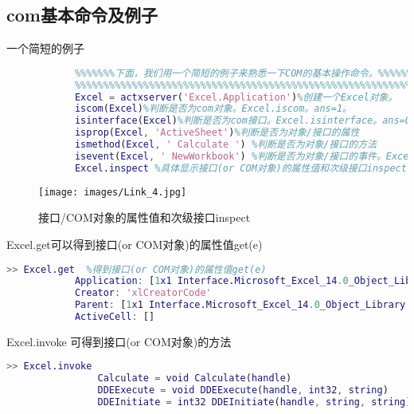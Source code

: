             \subsection{com基本命令及例子}
            一个简短的例子
            \begin{lstlisting}[language=Matlab]
            %%%%%%%%%%%%%%%%%%%%%%%%%%%%%%%%%%%%%%%%%%%%%%%%%%%%%%%%%%%%%%%%%%%%%%
            %%%%%%%下面，我们用一个简短的例子来熟悉一下COM的基本操作命令。%%%%%%%%
            %%%%%%%%%%%%%%%%%%%%%%%%%%%%%%%%%%%%%%%%%%%%%%%%%%%%%%%%%%%%%%%%%%%%%%
            Excel = actxserver('Excel.Application')%创建一个Excel对象。
            iscom(Excel)%判断是否为com对象。Excel.iscom。ans=1。
            isinterface(Excel)%判断是否为com接口。Excel.isinterface。ans=0。
            isprop(Excel, 'ActiveSheet')%判断是否为对象/接口的属性
            ismethod(Excel, ' Calculate ') %判断是否为对象/接口的方法
            isevent(Excel, ' NewWorkbook') %判断是否为对象/接口的事件。Excel.isevent
            Excel.inspect %具体显示接口(or COM对象)的属性值和次级接口inspect(e)如下图所示。
            \end{lstlisting}
            \begin{figure}[H]
            \centering
            \texttt{[image: images/Link\_4.jpg]}
            \caption{接口/COM对象的属性值和次级接口inspect}
            \label{fig:Link_4}
            \end{figure}
            Excel.get可以得到接口(or COM对象)的属性值get(e)
            \begin{lstlisting}[language=Matlab]
            >> Excel.get  %得到接口(or COM对象)的属性值get(e)
            Application: [1x1 Interface.Microsoft_Excel_14.0_Object_Library._Application]
            Creator: 'xlCreatorCode'
            Parent: [1x1 Interface.Microsoft_Excel_14.0_Object_Library._Application]
            ActiveCell: []
            \end{lstlisting}
            Excel.invoke 可得到接口(or COM对象)的方法
            \begin{lstlisting}[language=Matlab]
            >> Excel.invoke
                Calculate = void Calculate(handle)
                DDEExecute = void DDEExecute(handle, int32, string)
                DDEInitiate = int32 DDEInitiate(handle, string, string)
            \end{lstlisting}
